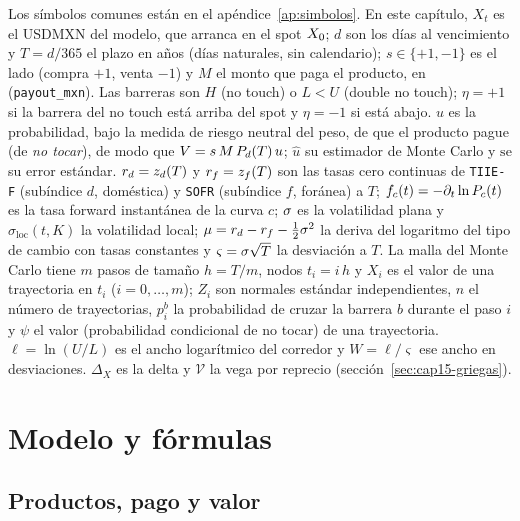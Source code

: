 Los símbolos comunes están en el apéndice~\ref{ap:simbolos}. En este capítulo, $X_t$ es el USDMXN del modelo, que
arranca en el spot $X_0$; $d$ son los días al vencimiento y $T=d/365$ el plazo en años (días naturales, sin calendario); $s\in\{+1,-1\}$
es el lado (compra $+1$, venta $-1$) y $M$ el monto que paga el producto, en \MXN{} (\texttt{payout\_mxn}). Las barreras son
$H$ (no touch) o $L<U$ (double no touch); $\eta=+1$ si la barrera del no touch está arriba del spot y $\eta=-1$ si está abajo.
$u$ es la probabilidad, bajo la medida de riesgo neutral del peso, de que el producto pague (de \emph{no tocar}), de modo que
$V=s\,M\,P_{d}(T)\,u$; $\hat u$ su estimador de Monte Carlo y $\mathrm{se}$ su error estándar. $r_d=z_{d}(T)$ y
$r_f=z_{f}(T)$ son las tasas cero continuas de \texttt{TIIE-F} (subíndice $d$, doméstica) y \texttt{SOFR} (subíndice $f$,
foránea) a $T$; $f_c(t)=-\partial_t\ln P_{c}(t)$ es la tasa forward instantánea de la curva $c$; $\sigma$ es la volatilidad
plana y $\sigma_{\mathrm{loc}}(t,K)$ la volatilidad local; $\mu=r_d-r_f-\tfrac12\sigma^2$ la deriva del logaritmo del
tipo de cambio con tasas constantes y $\varsigma=\sigma\sqrt T$ la desviación a $T$. La malla del Monte Carlo tiene $m$ pasos de
tamaño $h=T/m$, nodos $t_i=i\,h$ y $X_i$ es el valor de una trayectoria en $t_i$ ($i=0,\dots,m$); $Z_i$ son normales estándar
independientes, $n$ el número de trayectorias, $p_i^{b}$ la probabilidad de cruzar la barrera $b$ durante el paso $i$ y
$\psi$ el valor (probabilidad condicional de no tocar) de una trayectoria. $\ell=\ln(U/L)$ es el ancho logarítmico del corredor
y $W=\ell/\varsigma$ ese ancho en desviaciones. $\Delta_X$ es la delta y $\mathcal V$ la vega por reprecio (sección~\ref{sec:cap15-griegas}).

\section{Modelo y fórmulas}\label{sec:cap15-modelo}

\subsection{Productos, pago y valor}\label{sec:cap15-productos}

